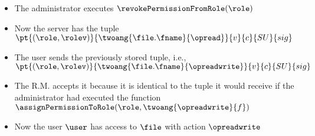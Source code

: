 {\begin{itemize}
\begin{itemize}
            \item The administrator executes \( \revokePermissionFromRole(\role) \)
            \item Now the server has the tuple \( \pt{(\role, \rolev)}{\twoang{\file.\fname}{\opread}}{v}{c}{SU}{sig} \)
            \item The user sends the previously stored tuple, i.e., \( \pt{(\role, \rolev)}{\twoang{\file.\fname}{\opreadwrite}}{v}{c}{SU}{sig} \)
            \item The R.M. accepts it because it is identical to the tuple it would receive if the administrator had executed the function \( \assignPermissionToRole(\role, \twoang{\opreadwrite}{f}) \)
            \item Now the user \(\user\) has access to \(\file\) with action \(\opreadwrite\)
        \end{itemize}


\end{itemize}}
